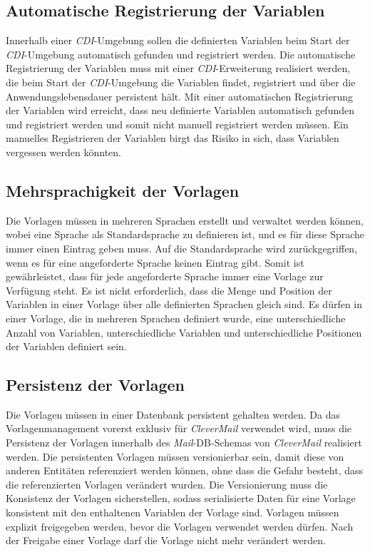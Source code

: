 \subsection{Automatische Registrierung der Variablen}
Innerhalb einer \emph{CDI}-Umgebung sollen die definierten Variablen beim Start der \emph{CDI}-Umgebung automatisch gefunden und registriert werden. Die automatische Registrierung der Variablen muss mit einer \emph{CDI}-Erweiterung realisiert werden, die beim Start der \emph{CDI}-Umgebung die Variablen findet, registriert und über die Anwendungslebensdauer persistent hält. Mit einer automatischen Registrierung der Variablen wird erreicht, dass neu definierte Variablen automatisch gefunden und registriert werden und somit nicht manuell registriert werden müssen. Ein manuelles Registrieren der Variablen birgt das Risiko in sich, dass Variablen vergessen werden könnten.

\subsection{Mehrsprachigkeit der Vorlagen}
Die Vorlagen müssen in mehreren Sprachen erstellt und verwaltet werden können, wobei eine Sprache als Standardsprache zu definieren ist, und es für diese Sprache immer einen Eintrag geben muss. Auf die Standardsprache wird zurückgegriffen, wenn es für eine angeforderte Sprache keinen Eintrag gibt. Somit ist gewährleistet, dass für jede angeforderte Sprache immer eine Vorlage zur Verfügung steht. Es ist nicht erforderlich, dass die Menge und Position der Variablen in einer Vorlage über alle definierten Sprachen gleich sind. Es dürfen in einer Vorlage, die in mehreren Sprachen definiert wurde, eine unterschiedliche Anzahl von Variablen, unterschiedliche Variablen und unterschiedliche Positionen der Variablen definiert sein.

\subsection{Persistenz der Vorlagen}
\label{sec:sub-template-variable-persistenz}
Die Vorlagen müssen in einer Datenbank persistent gehalten werden. Da das Vorlagenmanagement vorerst exklusiv für \emph{CleverMail} verwendet wird, muss die Persistenz der Vorlagen innerhalb des \emph{Mail}-DB-Schemas von \emph{CleverMail} realisiert werden. Die persistenten Vorlagen müssen versionierbar sein, damit diese von anderen Entitäten referenziert werden können, ohne dass die Gefahr besteht, dass die referenzierten Vorlagen verändert wurden. Die Versionierung muss die Konsistenz der Vorlagen sicherstellen, sodass serialisierte Daten für eine Vorlage konsistent mit den enthaltenen Variablen der Vorlage sind. Vorlagen müssen explizit freigegeben werden, bevor die Vorlagen verwendet werden dürfen. Nach der Freigabe einer Vorlage darf die Vorlage nicht mehr verändert werden.


